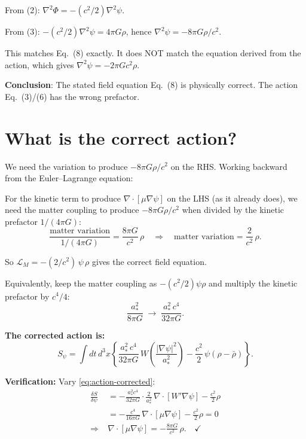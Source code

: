 \documentclass[aps,prd,twocolumn,nofootinbib]{revtex4-2}
\begin{document}
From (2): $\nabla^2\Phi = -(c^2/2)\nabla^2\psi$.

From (3): $-(c^2/2)\nabla^2\psi = 4\pi G\rho$, hence
$\nabla^2\psi = -8\pi G\rho/c^2$.

This matches Eq.~(8) exactly. It does NOT match the equation derived
from the action, which gives $\nabla^2\psi = -2\pi G c^2\rho$.

\textbf{Conclusion}: The stated field equation Eq.~(8) is physically correct.
The action Eq.~(3)/(6) has the wrong prefactor.

\section{What is the correct action?}
\label{sec:correct-action}

We need the variation to produce $-8\pi G\rho/c^2$ on the RHS. Working
backward from the Euler--Lagrange equation:

For the kinetic term to produce $\nabla\cdot[\mu\nabla\psi]$ on the LHS
(as it already does), we need the matter coupling to produce
$-8\pi G\rho/c^2$ when divided by the kinetic prefactor $1/(4\pi G)$:
\begin{equation}
\frac{\text{matter variation}}{1/(4\pi G)} = \frac{8\pi G}{c^2}\,\rho
\quad\Longrightarrow\quad
\text{matter variation} = \frac{2}{c^2}\,\rho.
\end{equation}

So $\mathcal{L}_M = -(2/c^2)\,\psi\,\rho$ gives the correct field equation.

Equivalently, keep the matter coupling as $-(c^2/2)\psi\rho$ and
multiply the kinetic prefactor by $c^4/4$:
\begin{equation}
\frac{a_*^2}{8\pi G} \;\longrightarrow\; \frac{a_*^2\,c^4}{32\pi G}.
\label{eq:corrected-prefactor}
\end{equation}

\textbf{The corrected action is:}
\begin{equation}
\boxed{
S_\psi = \int dt\,d^3x\left\{
  \frac{a_*^2\,c^4}{32\pi G}\,W\!\left(\frac{|\nabla\psi|^2}{a_*^2}\right)
  - \frac{c^2}{2}\,\psi(\rho - \bar\rho)
\right\}.
}
\label{eq:action-corrected}
\end{equation}

\textbf{Verification:} Vary \eqref{eq:action-corrected}:
\begin{align}
\frac{\delta S}{\delta\psi} &= -\frac{a_*^2 c^4}{32\pi G}
  \cdot\frac{2}{a_*^2}\,\nabla\cdot[W'\nabla\psi]
  - \frac{c^2}{2}\rho \nonumber\\
&= -\frac{c^4}{16\pi G}\,\nabla\cdot[\mu\nabla\psi]
  - \frac{c^2}{2}\rho = 0 \nonumber\\
\Rightarrow\;&
\nabla\cdot[\mu\nabla\psi] = -\frac{8\pi G}{c^2}\,\rho. \quad\checkmark
\end{align}
\end{document}

